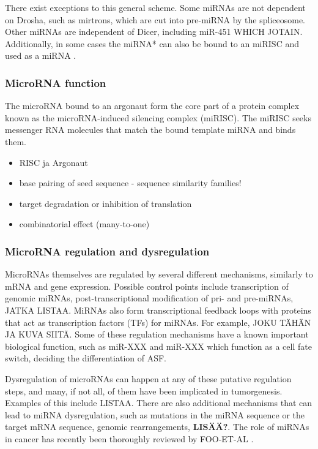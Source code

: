There exist exceptions to this general scheme. Some miRNAs are not dependent
on Drosha, such as mirtrons, which are cut into pre-miRNA by the spliceosome.
Other miRNAs are independent of Dicer, including miR-451 WHICH JOTAIN.
Additionally, in some cases the miRNA* can also be bound to an miRISC and used
as a miRNA \cite{CITE}.





\subsubsection{MicroRNA function}\label{microrna-function}

The microRNA bound to an argonaut form the core part of a protein complex
known as the microRNA-induced silencing complex (miRISC). The miRISC seeks
messenger RNA molecules that match the bound template miRNA and binds them.

\begin{itemize}
\tightlist
\item
  RISC ja Argonaut
\item
  base pairing of seed sequence - sequence similarity families!
\item
  target degradation or inhibition of translation
\item
  combinatorial effect (many-to-one)
\end{itemize}





\subsubsection{MicroRNA regulation and dysregulation}\label{microrna-
regulation-and-dysregulation}

MicroRNAs themselves are regulated by several different mechanisms, similarly
to mRNA and gene expression. Possible control points include transcription of
genomic miRNAs, post-transcriptional modification of pri- and pre-miRNAs,
JATKA LISTAA. MiRNAs also form transcriptional feedback loops with proteins
that act as transcription factors (TFs) for miRNAs. For example, JOKU TÄHÄN JA
KUVA SIITÄ. Some of these regulation mechanisms have a known important
biological function, such as miR-XXX and miR-XXX which function as a cell fate
switch, deciding the differentiation of ASF.

Dysregulation of microRNAs can happen at any of these putative regulation
steps, and many, if not all, of them have been implicated in tumorgenesis.
Examples of this include LISTAA. There are also additional mechanisms that can
lead to miRNA dysregulation, such as mutations in the miRNA sequence or the
target mRNA sequence, genomic rearrangements,
\textbf{LISÄÄ?}. The role of miRNAs in cancer has recently been
thoroughly reviewed by FOO-ET-AL \cite{CITE}.

